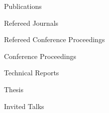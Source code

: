 
\begin{rSection}{Publications}
  \begin{rSubsection}{Refereed Journals}{}{}{}
    \printbibliography[keyword=journal,heading=none]
  \end{rSubsection}
  \begin{rSubsection}{Refereed Conference Proceedings}{}{}{}
    \printbibliography[keyword=proceeding,heading=none]
  \end{rSubsection}
  \begin{rSubsection}{Conference Proceedings}{}{}{}
    \printbibliography[keyword=nonRefereedProceeding,heading=none]
  \end{rSubsection}
  \begin{rSubsection}{Technical Reports}{}{}{}
    \printbibliography[keyword=techReport,heading=none]
  \end{rSubsection}
  \begin{rSubsection}{Thesis}{}{}{}
    \printbibliography[keyword=thesis,heading=none]
  \end{rSubsection}
  \begin{rSubsection}{Invited Talks}{}{}{}
    \printbibliography[keyword=invitedTalk,heading=none]
  \end{rSubsection}
\end{rSection}
